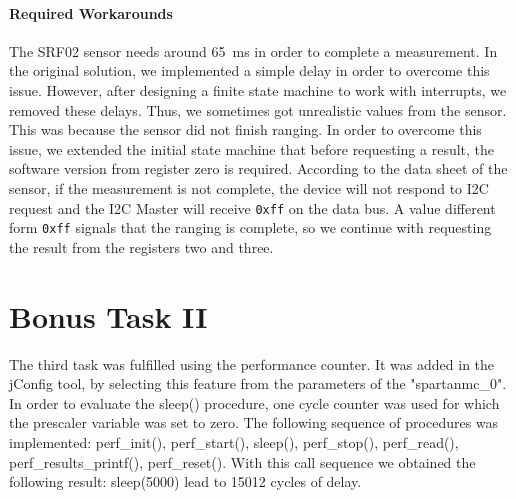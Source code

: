 			\paragraph{Required Workarounds} %
			\label{par:required_workarounds}
				The SRF02 sensor needs around \SI{65}{\milli\second} in order to complete a measurement. In the original solution, we implemented a simple delay in order to overcome this issue. However, after designing a finite state machine to work with interrupts, we removed these delays. Thus, we sometimes got unrealistic values from the sensor. This was because the sensor did not finish ranging.
				In order to overcome this issue, we extended the initial state machine that before requesting a result, the software version from register zero is required. According to the data sheet of the sensor, if the measurement is not complete, the device will not respond to I2C request and the I2C Master will receive \texttt{0xff} on the data bus. A value different form \texttt{0xff} signals that the ranging is complete, so we continue with requesting the result from the registers two and three.


	\section{Bonus Task II} %
	\label{sec:impl_bonus_task_2}
		The third task was fulfilled using the performance counter. It was added in the jConfig tool, by selecting this feature from the parameters of the "spartanmc\_0". In order to evaluate the sleep() procedure, one cycle counter was used for which the prescaler variable was set to zero. The following sequence of procedures was implemented: perf\_init(\*), perf\_start(\*), sleep(\*), perf\_stop(\*), perf\_read(\*), perf\_results\_printf(\*), perf\_reset(). With this call sequence we obtained the following result: sleep(5000) lead to 15012 cycles of delay.


